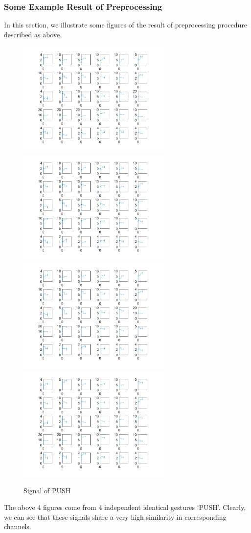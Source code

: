 \documentclass[conference]{IEEEtran}
\begin{document}
\subsubsection{Some Example Result of Preprocessing}
In this section, we illustrate some figures of the result of preprocessing procedure described as above.
\begin{figure}[H]
\centering
\includegraphics[width=3in]{ZOOMIN1.png}
\includegraphics[width=3in]{ZOOMIN2.png}
\includegraphics[width=3in]{ZOOMIN3.png}
\includegraphics[width=3in]{ZOOMIN4.png}
\caption{Signal of PUSH}
\end{figure}
The above 4 figures come from 4 independent identical gestures `PUSH'. Clearly, we can see that these signals share a very high similarity in corresponding channels.
\end{document}
